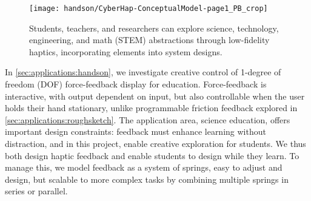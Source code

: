 \begin{figure} [bt]
  \centering
  \texttt{[image: handson/CyberHap-ConceptualModel-page1\_PB\_crop]}
  \caption{Students, teachers, and researchers can explore science, technology, engineering, and math (STEM) abstractions through low-fidelity haptics, incorporating elements into system designs.}
  \label{fig:conceptOverview}
\end{figure}

In \autoref{sec:applications:handson}, we investigate creative control of 1-degree of freedom (DOF) force-feedback display for education.
Force-feedback is interactive, with output dependent on input, but also controllable when the user holds their hand stationary, unlike programmable friction feedback explored in \autoref{sec:applications:roughsketch}.
The application area, science education, offers important design constraints: feedback must enhance learning without distraction, and in this project, enable creative exploration for students.
We thus both design haptic feedback and enable students to design while they learn.
To manage this, we model feedback as a system of springs, easy to adjust and design, but scalable to more complex tasks by combining multiple springs in series or parallel.


